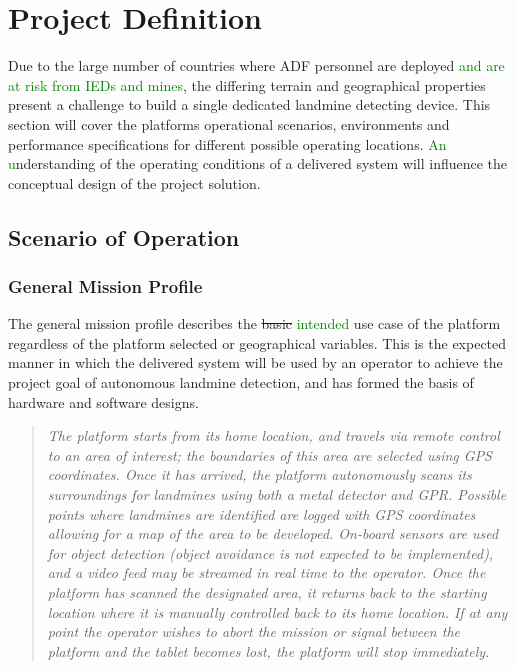 \documentclass[main.tex]{subfiles}
\begin{document}
\section{Project Definition}
Due to the large number of countries where ADF personnel are deployed \textcolor{green}{and are at risk from IEDs and mines}, the differing terrain and geographical properties present a challenge to build a single dedicated landmine detecting device. This section will cover the platforms operational scenarios, environments and performance specifications for different possible operating locations. \textcolor{green}{An u}nderstanding of the operating conditions of a delivered system will influence the conceptual design of the project solution.
\subsection{Scenario of Operation}

\subsubsection{General Mission Profile}
The general mission profile describes the \sout{basic} \textcolor{green}{intended} use case of the platform regardless of the platform selected or geographical variables. This is the expected manner in which the delivered system will be used by an operator to achieve the project goal of autonomous landmine detection, and has formed the basis of hardware and software designs.
\begin{quote}\textit{The platform starts from its home location, and travels via remote control to an area of interest; the boundaries of this area are selected using GPS coordinates. Once it has arrived, the platform autonomously scans its surroundings for landmines using both a metal detector and GPR. Possible points where landmines are identified are logged with GPS coordinates allowing for a map of the area to be developed. On-board sensors are used for object detection (object avoidance is not expected to be implemented), and a video feed may be streamed in real time to the operator. Once the platform has scanned the designated area, it returns back to the starting location where it is manually controlled back to its home location. If at any point the operator wishes to abort the mission or signal between the platform and the tablet becomes lost, the platform will stop immediately.}
\end{quote}
\end{document}
